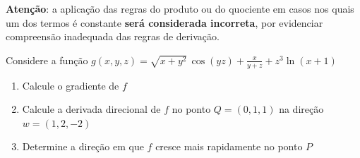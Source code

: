 \documentclass[a4paper,12pt,fleqn]{article}
\begin{document}

\bigskip
\textbf{Atenção}: a aplicação das regras do produto ou do quociente em casos
nos quais um dos termos é constante \textbf{será considerada incorreta},
por evidenciar compreensão inadequada das regras de derivação.

Considere a função
\(
  g(x, y, z) = \sqrt{x+y^2}\,\cos(yz)+\frac{x}{y+z}+z^3\ln(x+1)
\)
\begin{enumerate}[label=\alph*),nosep]
  \item Calcule o gradiente de $f$

  \item Calcule a derivada direcional de $f$ no ponto
  \(
    Q = (0, 1, 1)
  \)
  na direção
  \(
    w = (1, 2, -2)
  \)

  \item Determine a direção em que $f$ cresce mais rapidamente no ponto $P$
\end{enumerate}
\end{document}
